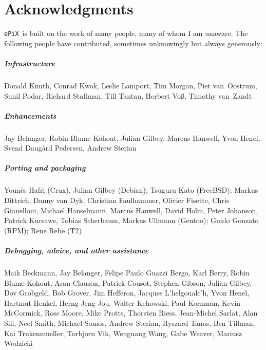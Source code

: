 \documentclass[12pt,letterpaper]{book}
\newcommand{\code}[1]{\texttt{#1}}
\newcommand{\ePiX}{\code{ePiX}}
\newcommand{\texinfoappendix}[2]{\chapter{#2}}
\begin{document}
\texinfoappendix{B}{Acknowledgments}

\ePiX\ is built on the work of many people, many of whom I am
unaware. The following people have contributed, sometimes unknowingly
but always generously:

\paragraph{Infrastructure} Donald Knuth, Conrad Kwok, Leslie Lamport,
Tim Morgan, Piet van~Oostrum, Sunil Podar, Richard Stallman, Till
Tantau, Herbert Vo\ss, Timothy van~Zandt

\paragraph{Enhancements} Jay Belanger, Robin Blume-Kohout, Julian
Gilbey, Marcus Hanwell, Yvon Henel, Svend Daug{\aa}rd Pedersen, Andrew
Sterian

\paragraph{Porting and packaging} Youn\`es Hafri (Crux), Julian Gilbey
(Debian); Tsuguru Kato (FreeBSD); Markus Dittrich, Danny van Dyk,
Christian Faulhammer, Olivier Fisette, Chris Gianelloni, Michael
Hanselmann, Marcus Hanwell, David Holm, Peter Johanson, Patrick
Kursawe, Tobias Scherbaum, Markus Ullmann (Gentoo); Guido Gonzato
(RPM); Rene Rebe (T2)

\paragraph{Debugging, advice, and other assistance} Maik Beckmann, Jay
Belanger, Felipe Paulo Guazzi Bergo, Karl Berry, Robin Blume-Kohout,
Aran Clauson, Patrick Cousot, Stephen Gibson, Julian Gilbey, Dov
Grobgeld, Bob Grover, Jim Hefferon, Jacques L'helgoualc'h, Yvon Henel,
Hartmut Henkel, Herng-Jeng Jou, Walter Kehowski, Paul Kornman, Kevin
McCormick, Ross Moore, Mike Protts, Thorsten Riess, Jean-Michel
Sarlat, Alan Sill, Neel Smith, Michael Somos, Andrew Sterian, Ryszard
Tanas, Ben Tillman, Kai Trukenmueller, Torbjorn Vik, Wenguang Wang,
Gabe Weaver, Mariusz Wodzicki
\end{document}
